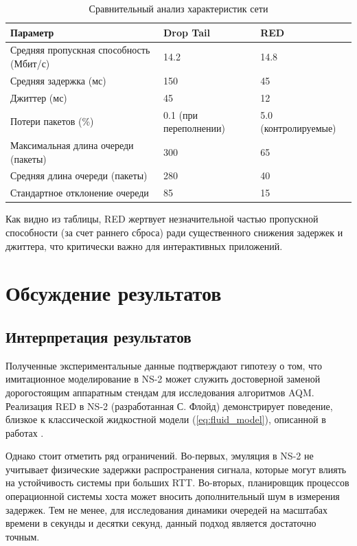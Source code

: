 \documentclass[10pt, conference, twocolumn, a4paper]{article}
\begin{document}
\begin{table}[h]
\centering
\small
\caption{Сравнительный анализ характеристик сети}
\label{tab:results}
\begin{tabularx}{\linewidth}{|>{\raggedright\arraybackslash}X|X|X|}
\hline
\textbf{Параметр} & \textbf{Drop Tail} & \textbf{RED} \\ \hline
Средняя пропускная способность (Мбит/с) & 14.2 & 14.8 \\ \hline
Средняя задержка (мс) & 150 & 45 \\ \hline
Джиттер (мс) & 45 & 12 \\ \hline
Потери пакетов (\%) & 0.1 (при переполнении) & 5.0 (контролируемые) \\ \hline
Максимальная длина очереди (пакеты) & 300 & 65 \\ \hline
Средняя длина очереди (пакеты) & 280 & 40 \\ \hline
Стандартное отклонение очереди & 85 & 15 \\ \hline
\end{tabularx}
\end{table}

Как видно из таблицы, RED жертвует незначительной частью пропускной способности (за счет раннего сброса) ради существенного снижения задержек и джиттера, что критически важно для интерактивных приложений.

\section{Обсуждение результатов}
\subsection{Интерпретация результатов}
Полученные экспериментальные данные подтверждают гипотезу о том, что имитационное моделирование в NS-2 может служить достоверной заменой дорогостоящим аппаратным стендам для исследования алгоритмов AQM. Реализация RED в NS-2 (разработанная С. Флойд) демонстрирует поведение, близкое к классической жидкостной модели (\ref{eq:fluid_model}), описанной в работах \cite{korolkova2010phd}.

Однако стоит отметить ряд ограничений. Во-первых, эмуляция в NS-2 не учитывает физические задержки распространения сигнала, которые могут влиять на устойчивость системы при больших RTT. Во-вторых, планировщик процессов операционной системы хоста может вносить дополнительный шум в измерения задержек. Тем не менее, для исследования динамики очередей на масштабах времени в секунды и десятки секунд, данный подход является достаточно точным.
\end{document}
